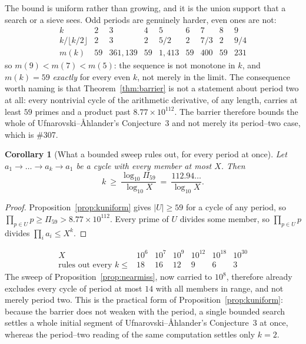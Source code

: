 \documentclass[11pt]{article}
\newtheorem{corollary}[theorem]{Corollary}
\theoremstyle{definition}
\begin{document}
The bound is uniform rather than growing, and it is the union support that a search or a sieve sees.
Odd periods are genuinely harder, even ones are not:
\[
\begin{array}{l|cccccccc}
k & 2 & 3 & 4 & 5 & 6 & 7 & 8 & 9\\\hline
k/\lfloor k/2\rfloor & 2 & 3 & 2 & 5/2 & 2 & 7/3 & 2 & 9/4\\
m(k) & 59 & 361{,}139 & 59 & 1{,}413 & 59 & 400 & 59 & 231
\end{array}
\]
so $m(9)<m(7)<m(5)$: the sequence is not monotone in $k$, and $m(k)=59$ \emph{exactly} for every
even $k$, not merely in the limit. The consequence
worth naming is that Theorem~\ref{thm:barrier} is not a statement about period two at all: every
nontrivial cycle of the arithmetic derivative, of any length, carries at least $59$ primes and a
product past $8.77\times10^{112}$. The barrier therefore bounds the whole of
Ufnarovski--\AA hlander's Conjecture~3 and not merely its period--two case, which is \#307.

\begin{corollary}[What a bounded sweep rules out, for every period at once]\label{cor:sweepperiod}
Let $a_1\to\dots\to a_k\to a_1$ be a cycle with every member at most $X$. Then
\[ k\ \ge\ \frac{\log_{10}\Pi_{59}}{\log_{10}X}\ =\ \frac{112.94\ldots}{\log_{10}X}. \]
\end{corollary}
\begin{proof}
Proposition~\ref{prop:kuniform} gives $|U|\ge59$ for a cycle of any period, so
$\prod_{p\in U}p\ge\Pi_{59}>8.77\times10^{112}$. Every prime of $U$ divides some member, so
$\prod_{p\in U}p$ divides $\prod_i a_i\le X^{k}$.
\end{proof}

\[
\begin{array}{l|cccccc}
X & 10^{6} & 10^{7} & 10^{9} & 10^{12} & 10^{18} & 10^{30}\\\hline
\text{rules out every }k\le & 18 & 16 & 12 & 9 & 6 & 3
\end{array}
\]
The sweep of Proposition~\ref{prop:nearmiss}, now carried to $10^{8}$, therefore already excludes
every cycle of period at most $14$ with all members in range, and not merely period two. This is the practical form
of Proposition~\ref{prop:kuniform}: because the barrier does not weaken with the period, a single
bounded search settles a whole initial segment of Ufnarovski--\AA hlander's Conjecture~3 at once,
whereas the period--two reading of the same computation settles only $k=2$.
\end{document}
